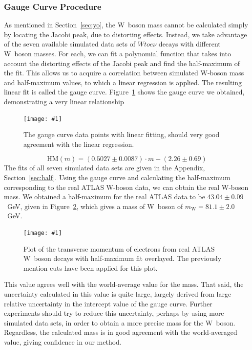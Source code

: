 \documentclass[twocolumn]{article}
\newcommand{\insertFigure}[1]{%
   \texttt{[image: \#1]}%
}
\begin{document}
\subsubsection{Gauge Curve Procedure} \label{sec:Wmass}
As mentioned in Section~\ref{sec:yo}, the W~boson mass cannot be calculated simply by locating the Jacobi peak, due to distorting effects. Instead, we take advantage of the seven available simulated data sets of $W to e\nu$ decays with different W~boson masses. For each, we can fit a polynomial function that takes into account the distorting effects of the Jacobi peak and find the half-maximum of the fit. This allows us to acquire a correlation between simulated W-boson mass and half-maximum values, to which a linear regression is applied. The resulting linear fit is called the gauge curve. Figure~\ref{fig:gaugecurve} shows the gauge curve we obtained, demonstrating a very linear relationship
\begin{figure}[!h]
	\centering
	\insertFigure{Images/Jacobihalfmax.png}
	\caption{The gauge curve data points with linear fitting, should very good agreement with the linear regression.}
	\label{fig:gaugecurve}
\end{figure}
\begin{equation}\nonumber
\text{HM}(m) = (0.5027 \pm 0.0087)\cdot m + (2.26 \pm 0.69)
\end{equation}
The fits of all seven simulated data sets are given in the Appendix, Section~\ref{sec:half}. Using the gauge curve and calculating the half-maximum corresponding to the real ATLAS W-boson data, we can obtain the real W-boson mass. We obtained a half-maximum for the real ATLAS data to be $43.04 \pm 0.09$~GeV, given in Figure~\ref{fig:halfW}, which gives a mass of W~boson of $m_\text{W} = 81.1 \pm 2.0$~GeV. 
\begin{figure}[!h]
	\centering
	\insertFigure{Images/WmassLabeled.png}
	\caption{Plot of the transverse momentum of electrons from real ATLAS W~boson decays with half-maximum fit overlayed. The previously mention cuts have been applied for this plot.}
	\label{fig:halfW}
\end{figure}
This value agrees well with the world-average value for the mass. That said, the uncertainty calculated in this value is quite large, largely derived from large relative uncertainty in the intercept value of the gauge curve. Further experiments should try to reduce this uncertainty, perhaps by using more simulated data sets, in order to obtain a more precise mass for the W~boson. Regardless, the calculated mass is in good agreement with the world-averaged value, giving confidence in our method.\\
\end{document}

